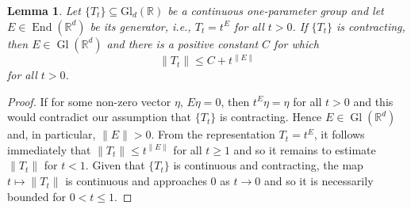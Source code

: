 \documentclass[11pt, letter]{book}
\newtheorem{lemma}[theorem]{Lemma}
\newcommand\End{\operatorname{End}} %
\newcommand\GldR{\mbox{Gl}_d(\mathbb{R})}%
\newcommand\Gl{\operatorname{Gl}} %
\begin{document}
\begin{lemma}\label{lem:OperatorBoundsforContractingGroup}
Let $\{T_t\}\subseteq\GldR$ be a continuous one-parameter group and let $E\in\End(\mathbb{R}^d)$ be its generator, i.e., $T_t=t^E$ for all $t>0$.
If $\{T_t\}$ is contracting, then $E\in\Gl(\mathbb{R}^d)$ and there is a positive constant $C$ for which
\begin{equation*}
\|T_t\|\leq C+t^{\|E\|}
\end{equation*}
for all $t>0$.
\end{lemma}
\begin{proof}
If for some non-zero vector $\eta$, $E\eta=0$, then $t^E\eta=\eta$ for all $t>0$ and this would contradict our assumption that $\{T_t\}$ is contracting. Hence $E\in\Gl(\mathbb{R}^d)$ and, in particular, $\|E\|>0$. From the representation $T_t=t^E$, it follows immediately that $\|T_t\|\leq t^{\|E\|}$ for all $t\geq 1$ and so it remains to estimate $\|T_t\|$ for $t<1$. Given that $\{T_t\}$ is continuous and contracting, the map $t\mapsto \|T_t\|$ is continuous and approaches $0$ as $t\rightarrow 0$ and so it is necessarily bounded for $0<t\leq 1$.
\end{proof}
\end{document}
